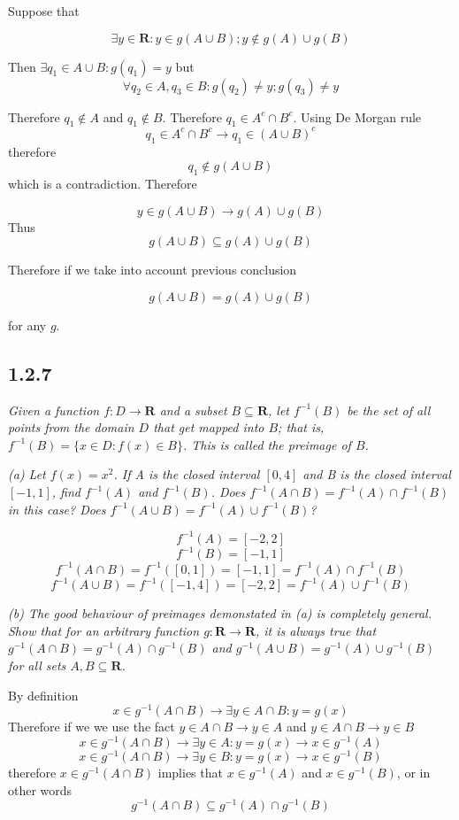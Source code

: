 \documentclass[11pt,oneside,titlepage]{book}
\begin{document}
Suppose that

$$\exists y \in \textbf{R}: y \in g(A \cup B); y \notin g(A) \cup g(B)$$

Then $\exists q_1 \in A \cup B: g(q_1) = y$ but
$$\forall q_2 \in A, q_3 \in B: g(q_2) \neq y; g(q_3) \neq y$$

Therefore $q_1 \notin A$ and $q_1 \notin B$. Therefore $q_1 \in A^c \cap B^c$.
Using De Morgan rule
$$q_1 \in A^c \cap B^c \to q_1 \in (A \cup B)^c$$
therefore 
$$q_1 \notin g(A \cup B)$$
which is a contradiction. Therefore

$$y \in g(A \cup B) \to g(A) \cup g(B)$$
Thus
$$g(A \cup B) \subseteq g(A) \cup g(B)$$

Therefore if we take into account previous conclusion

$$g(A \cup B) = g(A) \cup g(B)$$

for any $g$.

\subsection*{1.2.7}

\textit{Given a function $f: D \to \textbf{R}$ and a subset $B
  \subseteq \textbf{R}$, let $f^{-1}(B)$ be the set of all points
  from the domain $D$ that get mapped into $B$; that is,
  $f^{-1}(B) = \{x \in D: f(x) \in B\}$. This is called
  the preimage of $B$.}

\textit{(a) Let $f(x) = x^2$. If A is the closed interval $[0,4]$ and B is the
  closed interval $[-1, 1]$, find $f^{-1}(A)$ and $f^{-1}(B)$. Does
  $f^{-1}(A \cap B) = f^{-1}(A) \cap f^{-1}(B)$ in this case? Does
  $f^{-1}(A \cup B) = f^{-1}(A) \cup f^{-1}(B)$?
}

$$f^{-1}(A) = [-2, 2]$$
$$f^{-1}(B) = [-1, 1]$$
$$f^{-1}(A \cap B) = f^{-1}([0, 1]) = [-1, 1] = f^{-1}(A) \cap f^{-1}(B)$$
$$f^{-1}(A \cup B) = f^{-1}([-1, 4]) = [-2, 2] = f^{-1}(A) \cup f^{-1}(B)$$

\textit{(b) The good behaviour of preimages demonstated in (a) is completely
  general. Show that for an arbitrary function $g: \textbf{R} \to \textbf{R}$,
  it is always true that $g^{-1}(A \cap B) = g^{-1}(A) \cap g^{-1}(B)$ and
  $g^{-1}(A \cup B) = g^{-1}(A) \cup g^{-1}(B)$ for all sets $A, B \subseteq \textbf{R}$.
}

By definition
$$ x \in g^{-1}(A \cap B) \to \exists y \in A \cap B: y = g(x)$$
Therefore if we we use the fact  $y \in A \cap B \to y \in A$ and $y \in A \cap B \to y \in B$
$$ x \in g^{-1}(A \cap B) \to \exists y \in A: y = g(x) \to x \in g^{-1}(A)$$
$$ x \in g^{-1}(A \cap B) \to \exists y \in B: y = g(x) \to x \in g^{-1}(B)$$
therefore $x \in g^{-1}(A \cap B)$ implies that $x \in g^{-1}(A)$ and $x \in g^{-1}(B)$, or in other words
$$g^{-1}(A \cap B) \subseteq g^{-1}(A) \cap g^{-1}(B)$$
\end{document}
